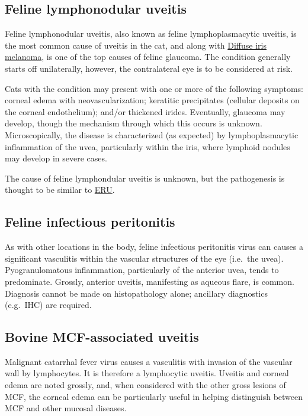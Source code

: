 \documentclass[
  openany]{article}
\begin{document}
\hypertarget{feline-lymphonodular-uveitis}{%
\subsection{Feline lymphonodular uveitis}\label{feline-lymphonodular-uveitis}}

Feline lymphonodular uveitis, also known as feline lymphoplasmacytic uveitis, is the most common cause of uveitis in the cat, and along with \protect\hyperlink{diffuse-iris-melanoma}{Diffuse iris melanoma}, is one of the top causes of feline glaucoma. The condition generally starts off unilaterally, however, the contralateral eye is to be considered at risk.

Cats with the condition may present with one or more of the following symptoms: corneal edema with neovascularization; keratitic precipitates (cellular deposits on the corneal endothelium); and/or thickened irides. Eventually, glaucoma may develop, though the mechanism through which this occurs is unknown. Microscopically, the disease is characterized (as expected) by lymphoplasmacytic inflammation of the uvea, particularly within the iris, where lymphoid nodules may develop in severe cases.

The cause of feline lymphondular uveitis is unknown, but the pathogenesis is thought to be similar to \protect\hyperlink{equine-recurrent-uveitis}{ERU}.

\hypertarget{feline-infectious-peritonitis}{%
\subsection{Feline infectious peritonitis}\label{feline-infectious-peritonitis}}

As with other locations in the body, feline infectious peritonitis virus can causes a significant vasculitis within the vascular structures of the eye (i.e.~the uvea). Pyogranulomatous inflammation, particularly of the anterior uvea, tends to predominate. Grossly, anterior uveitis, manifesting as aqueous flare, is common. Diagnosis cannot be made on histopathology alone; ancillary diagnostics (e.g.~IHC) are required.

\hypertarget{bovine-mcf-associated-uveitis}{%
\subsection{Bovine MCF-associated uveitis}\label{bovine-mcf-associated-uveitis}}

Malignant catarrhal fever virus causes a vasculitis with invasion of the vascular wall by lymphocytes. It is therefore a lymphocytic uveitis. Uveitis and corneal edema are noted grossly, and, when considered with the other gross lesions of MCF, the corneal edema can be particularly useful in helping distinguish between MCF and other mucosal diseases.
\end{document}

